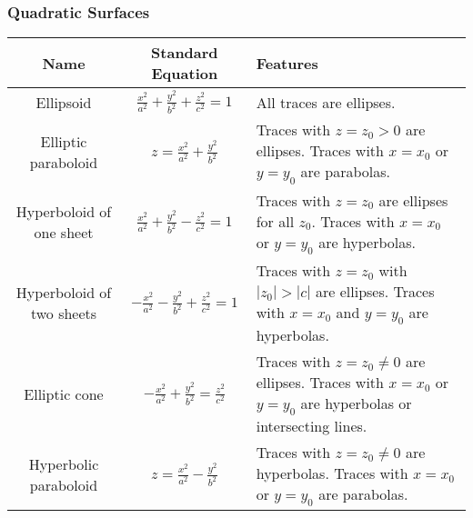 \subsubsection{Quadratic Surfaces}
\begin{tabularx}{\linewidth}{|c|c|X|}
    \hline
    \textbf{Name} & \textbf{Standard Equation} & \textbf{Features} \\ \hline
    Ellipsoid                   & $\frac{x^2}{a^2} + \frac{y^2}{b^2} + \frac{z^2}{c^2} = 1$     & All traces are ellipses. \\ \hline
    Elliptic paraboloid         & $z = \frac{x^2}{a^2} + \frac{y^2}{b^2}$                       & Traces with $z = z_0 > 0$ are ellipses. Traces with $ x = x_0$ or $y = y_0$ are parabolas. \\ \hline
    Hyperboloid of one sheet    & $\frac{x^2}{a^2} + \frac{y^2}{b^2} - \frac{z^2}{c^2} = 1$     & Traces with $z = z_0$ are ellipses for all $z_0$. Traces with $x = x_0$ or $y = y_0$ are hyperbolas. \\ \hline
    Hyperboloid of two sheets   & $-\frac{x^2}{a^2} - \frac{y^2}{b^2} + \frac{z^2}{c^2} = 1$    & Traces with $z = z_0$ with $|z_0| > |c|$ are ellipses. Traces with $x = x_0$ and $y = y_0$ are hyperbolas. \\ \hline
    Elliptic cone               & $-\frac{x^2}{a^2} + \frac{y^2}{b^2} = \frac{z^2}{c^2}$        & Traces with $z = z_0 \neq 0$ are ellipses. Traces with $x = x_0$ or $y = y_0$ are hyperbolas or intersecting lines. \\ \hline
    Hyperbolic paraboloid       & $z = \frac{x^2}{a^2} - \frac{y^2}{b^2}$                       & Traces with $z = z_0 \neq 0$ are hyperbolas. Traces with $x = x_0$ or $y = y_0$ are parabolas. \\ \hline
\end{tabularx}


